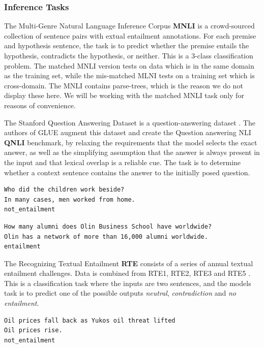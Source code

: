 \documentclass[a4paper,12pt,twoside,openright]{report}
\begin{document}
\subsubsection{Inference Tasks}

The Multi-Genre Natural Language Inference Corpus \textbf{MNLI} \cite{N18-1101} \cite{bowman2015} is a crowd-sourced collection of sentence pairs with extual entailment annotations.
For each premise and hypothesis sentence, the task is to predict whether the premise entails the hypothesis, contradicts the hypothesis, or neither.
This is a 3-class classification problem.
The matched MNLI version tests on data which is in the same domain as the training set, while the mis-matched MLNI tests on a training set which is cross-domain.
The MNLI contains parse-trees, which is the reason we do not display these here.
We will be working with the matched MNLI task only for reasons of convenience.

The Stanford Question Answering Dataset is a question-answering dataset \cite{rajpurkar2016}. 
The authors of GLUE augment this dataset and create the Question answering NLI \textbf{QNLI} benchmark, by relaxing the requirements that the model selects the exact answer, as well as the simplifying assumption that the answer is always present in the input and that lexical overlap is a reliable cue.
The task is to determine whether a context sentence contains the answer to the initially posed question. 

\begin{verbatim}
Who did the children work beside?	
In many cases, men worked from home.
not_entailment
\end{verbatim}

\begin{verbatim}
How many alumni does Olin Business School have worldwide?
Olin has a network of more than 16,000 alumni worldwide.
entailment
\end{verbatim}


The Recognizing Textual Entailment \textbf{RTE} consists of a series of annual textual entailment challenges. 
Data is combined from RTE1, RTE2, RTE3 and RTE5 \cite{dagan2005} \cite{bar2006} \cite{bentivogli2009} \cite{giampiccolo2007}. 
This is a classification task where the inputs are two sentences, and the models task is to predict one of the possible outputs \textit{neutral}, \textit{contradiction} and \textit{no entailment}.

\begin{verbatim}
Oil prices fall back as Yukos oil threat lifted	
Oil prices rise.
not_entailment
\end{verbatim}
\end{document}

